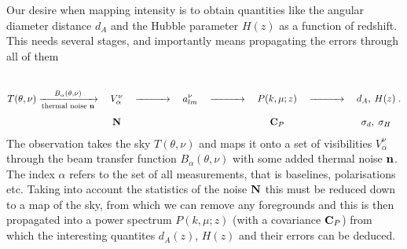 \documentclass[onecolumn]{revtex4}
\begin{document}
Our desire when mapping \tcm{} intensity is to obtain quantities like the
angular diameter distance $d_A$ and the Hubble parameter $H(z)$ as a function of
redshift. This needs several stages, and importantly means propagating the
errors through all of them
\begin{equation}
  T(\theta, \nu) \xrightarrow[\text{thermal noise }\mathbf{n}]{B_\alpha(\theta,\nu)} \quad \begin{matrix} \\ \\V_\alpha^\nu \\ \\ \mathbf{N}\end{matrix} \quad
  \xrightarrow{\qquad\quad} \quad a_{lm}^\nu  \quad \xrightarrow{\qquad\quad} \quad \begin{matrix} \\ \\P(k, \mu; z) \\ \\ \mathbf{C}_P \end{matrix}  \quad \xrightarrow{\qquad\quad} \quad \begin{matrix} \\ \\  d_A,\: H(z)  \\ \\ \sigma_d, \; \sigma_H \end{matrix} \; .
\end{equation}
The observation takes the sky $T(\theta, \nu)$ and maps it onto a set of
visibilities $V_\alpha^\nu$ through the beam transfer function $B_\alpha(\theta,
\nu)$ with some added thermal noise $\mathbf{n}$. The index $\alpha$ refers to the set
of all measurements, that is baselines, polarisations etc. Taking into account
the statistics of the noise $\mathbf{N}$ this must be reduced down to a map of the sky,
from which we can remove any foregrounds and this is then propagated into a
power spectrum $P(k, \mu; z)$ (with a covariance $\mathbf{C}_P$) from which the
interesting quantites $d_A(z)$, $H(z)$ and their errors can be deduced.
\end{document}
